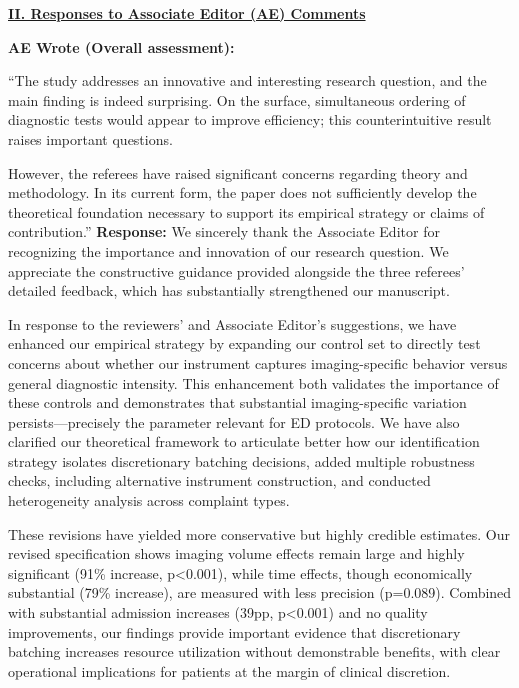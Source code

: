 \documentclass[11pt]{article}
\newenvironment{quote2}
{ \bigskip
\noindent
         \small\em
         \baselineskip=14pt
}
\newcommand{\1}{\hbox{\rm 1\kern-.35em 1}}
\begin{document}
\pagestyle{fancy}
\fancyhead{}
\renewcommand{\headrulewidth}{0.0pt}

\noindent\underline{\textbf{II. Responses to Associate Editor (AE) Comments}}

\begin{quote2}
\textbf{AE Wrote (Overall assessment):} 

\noindent ``The study addresses an innovative and interesting research question, and the main finding is indeed surprising. On the surface, simultaneous ordering of diagnostic tests would appear to improve efficiency; this counterintuitive result raises important questions.

However, the referees have raised significant concerns regarding theory and methodology. In its current form, the paper does not sufficiently develop the theoretical foundation necessary to support its empirical strategy or claims of contribution.” 
\end{quote2}

\noindent\textbf{Response:} \color{blue}We sincerely thank the Associate Editor for recognizing the importance and innovation of our research question. We appreciate the constructive guidance provided alongside the three referees' detailed feedback, which has substantially strengthened our manuscript.

In response to the reviewers' and Associate Editor's suggestions, we have enhanced our empirical strategy by expanding our control set to directly test concerns about whether our instrument captures imaging-specific behavior versus general diagnostic intensity. This enhancement both validates the importance of these controls and demonstrates that substantial imaging-specific variation persists—precisely the parameter relevant for ED protocols. We have also clarified our theoretical framework to articulate better how our identification strategy isolates discretionary batching decisions, added multiple robustness checks, including alternative instrument construction, and conducted heterogeneity analysis across complaint types.

These revisions have yielded more conservative but highly credible estimates. Our revised specification shows imaging volume effects remain large and highly significant (91\% increase, p<0.001), while time effects, though economically substantial (79\% increase), are measured with less precision (p=0.089). Combined with substantial admission increases (39pp, p<0.001) and no quality improvements, our findings provide important evidence that discretionary batching increases resource utilization without demonstrable benefits, with clear operational implications for patients at the margin of clinical discretion.
\end{document}
